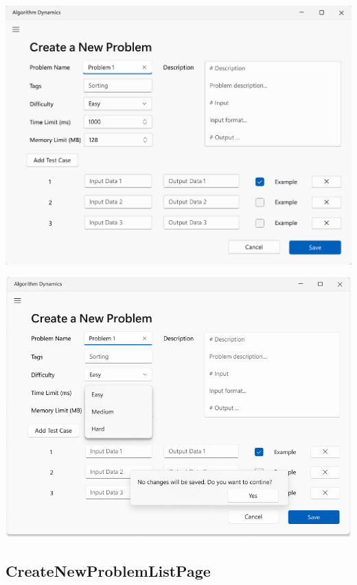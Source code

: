 \documentclass[a4paper]{report}
\begin{document}
\includegraphics[width=\textwidth, height=\textheight, keepaspectratio]{CreateNewProblemPage-design}

\includegraphics[width=\textwidth, height=\textheight, keepaspectratio]{CreateNewProblemPage-Expand-design}

\subsection{CreateNewProblemListPage}
\end{document}
